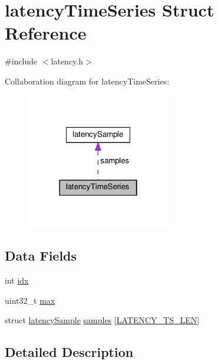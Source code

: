 \hypertarget{structlatency_time_series}{}\section{latency\+Time\+Series Struct Reference}
\label{structlatency_time_series}


{\ttfamily \#include $<$latency.\+h$>$}



Collaboration diagram for latency\+Time\+Series\+:
\nopagebreak
\begin{figure}[H]
\begin{center}
\leavevmode
\includegraphics[width=178pt]{structlatency_time_series__coll__graph}
\end{center}
\end{figure}
\subsection*{Data Fields}
\begin{DoxyCompactItemize}
\item 
int \hyperlink{structlatency_time_series_ae40354a1051342eb5a9db005715dcfa9}{idx}
\item 
uint32\+\_\+t \hyperlink{structlatency_time_series_a43e74ba18dc1a237d9f7737ce8df350e}{max}
\item 
struct \hyperlink{structlatency_sample}{latency\+Sample} \hyperlink{structlatency_time_series_a153186b2a352798a182b7269613f2466}{samples} \mbox{[}\hyperlink{latency_8h_a7e3ba352d9d7bb4c88c2c42c16e6674b}{L\+A\+T\+E\+N\+C\+Y\+\_\+\+T\+S\+\_\+\+L\+EN}\mbox{]}
\end{DoxyCompactItemize}


\subsection{Detailed Description}



